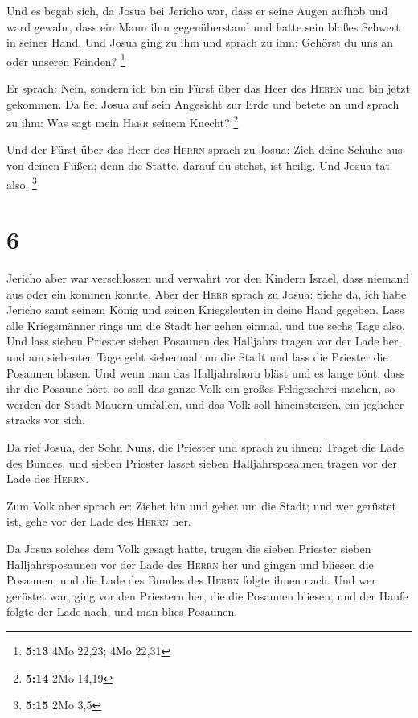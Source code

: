  Und es begab sich, da Josua bei Jericho war, dass er
seine Augen aufhob und ward gewahr, dass ein Mann ihm gegenüberstand und
hatte sein bloßes Schwert in seiner Hand. Und Josua ging zu ihm und
sprach zu ihm: Gehörst du uns an oder unseren Feinden? \footnote{\textbf{5:13}
  4Mo 22,23; 4Mo 22,31}

 Er sprach: Nein, sondern ich bin ein Fürst über das Heer
des \textsc{Herrn} und bin jetzt gekommen. Da fiel Josua auf sein
Angesicht zur Erde und betete an und sprach zu ihm: Was sagt mein
\textsc{Herr} seinem Knecht? \footnote{\textbf{5:14} 2Mo 14,19}

 Und der Fürst über das Heer des \textsc{Herrn} sprach zu
Josua: Zieh deine Schuhe aus von deinen Füßen; denn die Stätte, darauf
du stehst, ist heilig. Und Josua tat also. \footnote{\textbf{5:15} 2Mo
  3,5}

\hypertarget{section-1}{%
\section{6}\label{section-1}}

 Jericho aber war verschlossen und verwahrt vor den
Kindern Israel, dass niemand aus oder ein kommen konnte, 
Aber der \textsc{Herr} sprach zu Josua: Siehe da, ich habe Jericho samt
seinem König und seinen Kriegsleuten in deine Hand gegeben.
 Lass alle Kriegsmänner rings um die Stadt her gehen
einmal, und tue sechs Tage also.  Und lass sieben Priester
sieben Posaunen des Halljahrs tragen vor der Lade her, und am siebenten
Tage geht siebenmal um die Stadt und lass die Priester die Posaunen
blasen.  Und wenn man das Halljahrshorn bläst und es lange
tönt, dass ihr die Posaune hört, so soll das ganze Volk ein großes
Feldgeschrei machen, so werden der Stadt Mauern umfallen, und das Volk
soll hineinsteigen, ein jeglicher stracks vor sich.

 Da rief Josua, der Sohn Nuns, die Priester und sprach zu
ihnen: Traget die Lade des Bundes, und sieben Priester lasset sieben
Halljahrsposaunen tragen vor der Lade des \textsc{Herrn}.

 Zum Volk aber sprach er: Ziehet hin und gehet um die
Stadt; und wer gerüstet ist, gehe vor der Lade des \textsc{Herrn} her.

 Da Josua solches dem Volk gesagt hatte, trugen die sieben
Priester sieben Halljahrsposaunen vor der Lade des \textsc{Herrn} her
und gingen und bliesen die Posaunen; und die Lade des Bundes des
\textsc{Herrn} folgte ihnen nach.  Und wer gerüstet war,
ging vor den Priestern her, die die Posaunen bliesen; und der Haufe
folgte der Lade nach, und man blies Posaunen.


